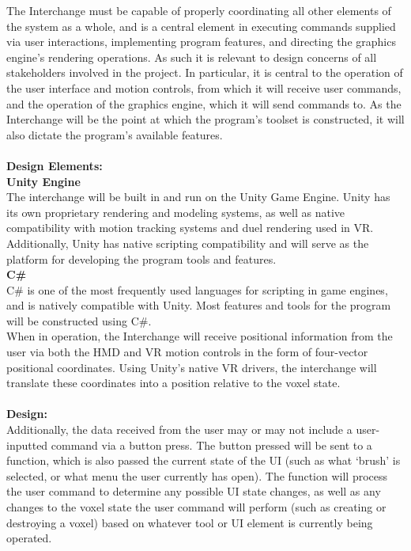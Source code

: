 \documentclass[onecolumn, draftclsnofoot,10pt, compsoc]{IEEEtran}
\begin{document}
The Interchange must be capable of properly coordinating all other elements of the system as a whole, and is a central element  in executing commands supplied via user interactions, implementing program features, and directing the graphics engine’s rendering operations. As such it is relevant to design concerns of all stakeholders involved in the project. In particular, it is central to the operation of the user interface and motion controls, from which it will receive user commands, and the operation of the graphics engine, which it will send commands to. As the Interchange will be the point at which the program’s toolset is constructed, it will also dictate the program’s available features.\\ \\
\textbf{Design Elements:}\\ 
\textbf{Unity Engine} \\
The interchange will be built in and run on the Unity Game Engine. Unity has its own proprietary rendering and modeling systems, as well as native compatibility with motion tracking systems and duel rendering used in VR. Additionally, Unity has native scripting compatibility and will serve as the platform for developing the program tools and features.\cite{unity} \\  
\textbf{C\#} \\
C\# is one of the most frequently used languages for scripting in game engines, and is natively compatible with Unity. Most features and tools for the program will be constructed using C\#. \\
When in operation, the Interchange will receive positional information from the user via both the HMD and VR motion controls in the form of four-vector positional coordinates. Using Unity’s native VR drivers, the interchange will translate these coordinates into a position relative to the voxel state. \\ \\ 
\textbf{Design:} \\
Additionally, the data received from the user may or may not include a user-inputted command via a button press. The button pressed will be sent to a function, which is also passed the current state of the UI (such as what ‘brush’ is selected, or what menu the user currently has open). The function will process the user command to determine any possible UI state changes, as well as any changes to the voxel state the user command will perform (such as creating or destroying a voxel) based on whatever tool or UI element is currently being operated. 
\end{document}
